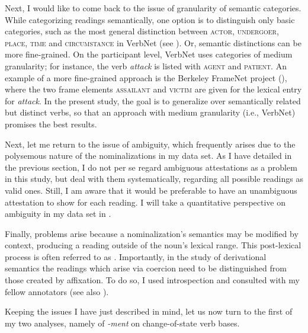 Next, I would like to come back to the issue of granularity of semantic categories. While categorizing readings semantically, one option is to distinguish only basic categories, such as the most general distinction between \textsc{actor, undergoer, place, time} and \textsc{circumstance} in VerbNet (see \citealt[331]{Palmer.2017}). Or, semantic distinctions can be more fine-grained. On the participant level, VerbNet uses categories of medium granularity; for instance, the verb \textit{attack} is listed with \textsc{agent} and \textsc{patient}. An example of a more fine-grained approach is the Berkeley FrameNet project (\citealt{Fillmore.2003}), where the two frame elements \textsc{assailant} and \textsc{victim} are given for the lexical entry for \textit{attack}. In the present study, the goal is to generalize over semantically related but distinct verbs, so that an approach with medium granularity (i.e., VerbNet) promises the best results. 

Next, let me return to the issue of ambiguity, which frequently arises due to the polysemous nature of the nominalizations in my data set. 
As I have detailed in the previous section, I do not per se regard ambiguous attestations as a problem in this study, but deal with them systematically, regarding all possible readings as valid ones. Still, I am aware that it would be preferable to have an unambiguous attestation to show for each reading. I will take a quantitative perspective on ambiguity in my data set in .

Finally, problems arise because a nominalization's semantics may be modified by context, producing a reading outside of the noun's lexical range. This post-lexical process is often referred to as . Importantly, in the study of derivational semantics the readings which arise via coercion need to be distinguished from those created by affixation. To do so, I used introspection and consulted with my fellow annotators (see also ).

Keeping the issues I have just described in mind, let us now turn to the first of my two analyses, namely of \textit{-ment} on change-of-state verb bases.
